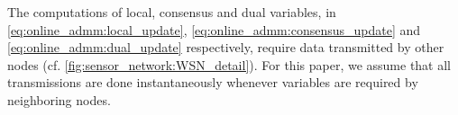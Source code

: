 \documentclass{article}
\begin{document}
The computations of local, consensus and dual variables, in \eqref{eq:online_admm:local_update}, \eqref{eq:online_admm:consensus_update} and \eqref{eq:online_admm:dual_update} respectively, require data transmitted by other nodes (cf. \autoref{fig:sensor_network:WSN_detail}). For this paper, we assume that all transmissions are done instantaneously whenever variables are required by neighboring nodes.



\end{document}
